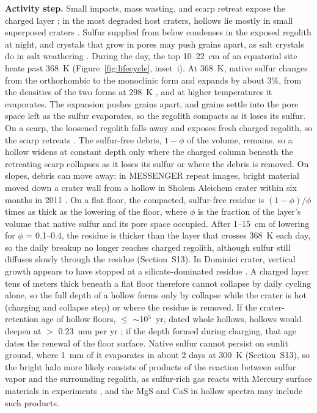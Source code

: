 \documentclass[article,review]{planetary}
\begin{document}
\textbf{Activity step.} Small impacts, mass wasting, and scarp retreat expose the charged layer \parencite{blewett2016,wright2020,speyerer2022,deutsch2025}; in the most degraded host craters, hollows lie mostly in small superposed craters \parencite{giroud2024}. Sulfur supplied from below condenses in the exposed regolith at night, and crystals that grow in pores may push grains apart, as salt crystals do in salt weathering \parencite{scherer2004,melosh2011}. During the day, the top 10--22~cm of an equatorial site heats past 368~K (Figure~\ref{fig:lifecycle}, inset~i). At 368~K, native sulfur changes from the orthorhombic to the monoclinic form and expands by about 3\%, from the densities of the two forms at 298~K \parencite{steudel2003}, and at higher temperatures it evaporates. The expansion pushes grains apart, and grains settle into the pore space left as the sulfur evaporates, so the regolith compacts as it loses its sulfur. On a scarp, the loosened regolith falls away and exposes fresh charged regolith, so the scarp retreats \parencite{blewett2016}. The sulfur-free debris, $1-\phi$ of the volume, remains, so a hollow widens at constant depth only where the charged column beneath the retreating scarp collapses as it loses its sulfur or where the debris is removed. On slopes, debris can move away: in MESSENGER repeat images, bright material moved down a crater wall from a hollow in Sholem Aleichem crater within six months in 2011 \parencite{speyerer2022}. On a flat floor, the compacted, sulfur-free residue is $(1-\phi)/\phi$ times as thick as the lowering of the floor, where $\phi$ is the fraction of the layer's volume that native sulfur and its pore space occupied. After 1--15~cm of lowering for $\phi$ = 0.1--0.4, the residue is thicker than the layer that crosses 368~K each day, so the daily breakup no longer reaches charged regolith, although sulfur still diffuses slowly through the residue (Section~S13). In Dominici crater, vertical growth appears to have stopped at a silicate-dominated residue \parencite{emran2025}. A charged layer tens of meters thick beneath a flat floor therefore cannot collapse by daily cycling alone, so the full depth of a hollow forms only by collapse while the crater is hot (charging and collapse step) or where the residue is removed. If the crater-retention age of hollow floors, $\leq$ $\sim$10$^5$~yr, dated whole hollows, hollows would deepen at $>$ 0.23~mm per yr \parencite{wang2020}; if the depth formed during charging, that age dates the renewal of the floor surface. Native sulfur cannot persist on sunlit ground, where 1~mm of it evaporates in about 2 days at 300~K (Section~S13), so the bright halo more likely consists of products of the reaction between sulfur vapor and the surrounding regolith, as sulfur-rich gas reacts with Mercury surface materials in experiments \parencite{renggli2022}, and the MgS and CaS in hollow spectra \parencite{vilas2016,emran2025} may include such products.
\end{document}
